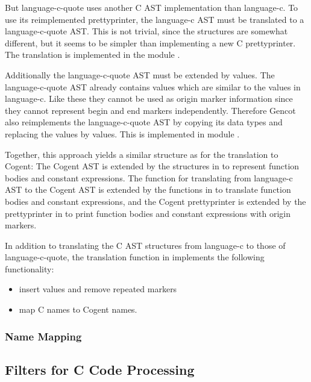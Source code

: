 But language-c-quote uses another C AST implementation than language-c. To use its reimplemented prettyprinter, the 
language-c AST must be translated to a language-c-quote AST. This is not trivial, since the structures are somewhat
different, but it seems to be simpler than implementing a new C prettyprinter. The translation is implemented in
the module . 

Additionally the language-c-quote AST must be extended by  values. The language-c-quote AST already 
contains  values which are similar to the  values in language-c. Like these they cannot
be used as origin marker information since they cannot represent begin and end markers independently. Therefore
Gencot also reimplements the language-c-quote AST by copying its data types and replacing the 
values by  values. This is implemented in module .

Together, this approach yields a similar structure as for the translation to Cogent: The Cogent AST is extended 
by the structures in  to represent function bodies and constant expressions. The function for
translating from language-c AST to the Cogent AST is extended by the functions in  to
translate function bodies and constant expressions, and the Cogent prettyprinter is extended by the prettyprinter
in  to print function bodies and constant expressions with origin markers.

In addition to translating the C AST structures from language-c to those of language-c-quote, the translation
function in  implements the following functionality:
\begin{itemize}
\item insert  values and remove repeated markers
\item map C names to Cogent names.
\end{itemize}

\subsubsection{Name Mapping}



\subsection{Filters for C Code Processing}
\label{impl-ccode-filters}

